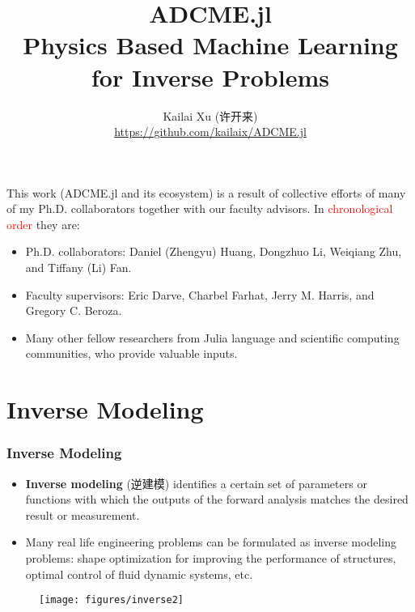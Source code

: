 \documentclass[usenames,dvipsnames]{beamer}
\title[Physics Based Machine Learning]{ADCME.jl \\ {Physics Based Machine Learning for Inverse Problems}} %
\author[ADCME]{Kailai Xu (许开来)\\\url{https://github.com/kailaix/ADCME.jl}} %
\date{}%
\begin{document}
\begin{frame}

\titlepage %

\end{frame}
\usebackgroundtemplate{}




\begin{frame}
	This work (ADCME.jl and its ecosystem) is a result of collective efforts of many of my Ph.D. collaborators together with our faculty advisors. In \textcolor{red}{chronological order} they are:
	
	\begin{itemize}
		\item Ph.D. collaborators: Daniel (Zhengyu) Huang, Dongzhuo Li, Weiqiang Zhu, and Tiffany (Li) Fan. 
		\item Faculty supervisors: Eric Darve, Charbel Farhat, Jerry M. Harris, and Gregory C. Beroza. 
		\item Many other fellow researchers from Julia language and scientific computing communities, who provide valuable inputs. 
	\end{itemize}
\end{frame}



\section{Inverse Modeling}



\begin{frame}
	\frametitle{Inverse Modeling}
	\begin{itemize}
		\item \textbf{Inverse modeling} (逆建模) identifies a certain set of parameters or functions with which the outputs of the forward analysis matches the desired result or measurement.
		\item Many real life engineering problems can be formulated as inverse modeling problems: shape optimization for improving the performance of structures, optimal control of fluid dynamic systems, etc.
	\end{itemize}
	\begin{figure}[hbt]
	\centering
  \texttt{[image: figures/inverse2]}
\end{figure}
\end{frame}
\end{document}
